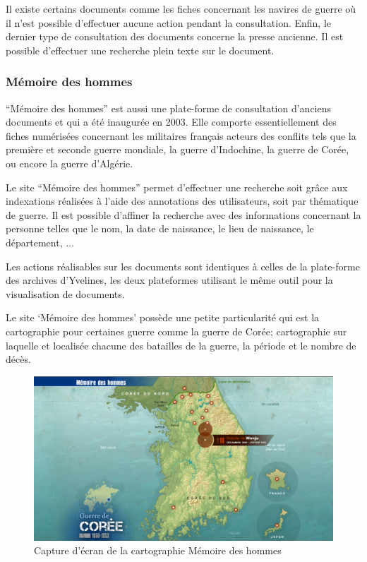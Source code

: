         Il existe certains documents comme les fiches concernant les navires de guerre où il n’est possible d’effectuer aucune action pendant la consultation. Enfin, le dernier type de consultation des documents concerne la presse ancienne. Il est possible d’effectuer une recherche plein texte sur le document.

        \subsubsection{Mémoire des hommes}
        \label{subsubsec:memoire}
        “Mémoire des hommes” est aussi une plate-forme de consultation d’anciens documents et qui a été inaugurée en 2003. Elle comporte essentiellement des fiches numérisées concernant les militaires français acteurs des conflits tels que la première et seconde guerre mondiale, la guerre d’Indochine, la guerre de Corée, ou encore la guerre d’Algérie. 

        Le site “Mémoire des hommes” permet d’effectuer une recherche soit grâce aux indexations réalisées à l’aide des annotations des utilisateurs, soit par thématique de guerre. Il est possible d’affiner la recherche avec des informations concernant la personne telles que le nom, la date de naissance, le lieu de naissance, le département, ...

        Les actions réalisables sur les documents sont identiques à celles de la plate-forme des archives d’Yvelines, les deux plateformes utilisant le même outil pour la visualisation de documents.

        Le site ‘Mémoire des hommes’ possède une petite particularité qui est la cartographie pour certaines guerre comme la guerre de Corée;  cartographie sur laquelle et localisée chacune des batailles de la guerre, la période et le nombre de décès.

        \begin{figure}[ht!]
            \centering
            \includegraphics[width=1\textwidth]{figure/screen_memoire_hommes.png}
            \caption{Capture d'écran de la cartographie Mémoire des hommes}
            \label{fig:gallica}
        \end{figure}

